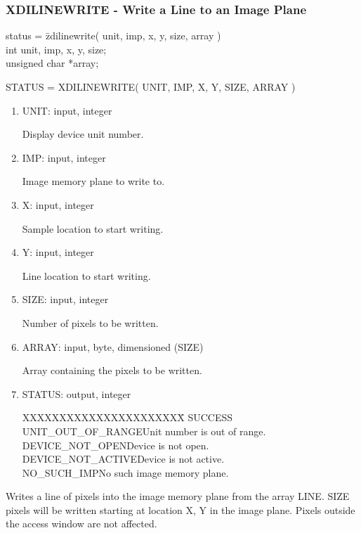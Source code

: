 \subsubsection{XDILINEWRITE - Write a Line to an Image Plane }
\begin{tabbing}
status = \=zdilinewrite( unit, imp, x, y, size, array )\\
\>int  unit, imp, x, y, size;\\
\>unsigned char  *array;\\
\end{tabbing}
STATUS = XDILINEWRITE( UNIT, IMP, X, Y, SIZE, ARRAY )
\begin{enumerate}
\item UNIT:  input, integer

Display device unit number.
\item IMP:  input, integer

Image memory plane to write to.
\item X:  input, integer

Sample location to start writing.
\item Y:  input, integer

Line location to start writing.
\item SIZE:  input, integer

Number of pixels to be written.
\item ARRAY:  input, byte, dimensioned (SIZE)

Array containing the pixels to be written.
\item STATUS:  output, integer
\begin{tabbing}
XXXXXXXXXXXXXXXXXXXXXX\=\kill
SUCCESS\\
UNIT\_OUT\_OF\_RANGE\>Unit number is out of range.\\
DEVICE\_NOT\_OPEN\>Device is not open.\\
DEVICE\_NOT\_ACTIVE\>Device is not active.\\
NO\_SUCH\_IMP\>No such image memory plane.\\
\end{tabbing}
\end{enumerate}
Writes a line of pixels into the image memory plane from the array
LINE.  SIZE pixels will be written starting at location X, Y in the
image plane.  Pixels outside the access window are not
affected.
\newpage
